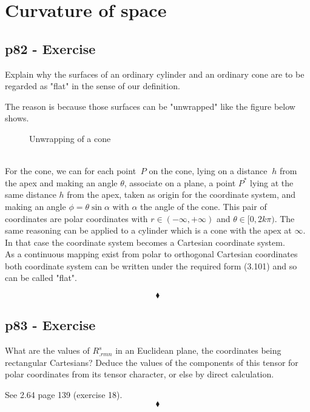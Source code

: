 \chapter{Curvature of space}
\pagebreak[4]

\section{p82 - Exercise}
\begin{tcolorbox}
Explain why the surfaces of an ordinary cylinder and an ordinary cone are to be regarded as "flat" in the sense of our definition.
\end{tcolorbox}
The reason is because those surfaces can be "unwrapped" like the figure below shows. 
\begin{figure}[h]


\caption{Unwrapping of a cone}
\end{figure}\\
For the cone, we can for each point $\ P $ on the cone, lying on a distance $\ h $ from the apex and making an angle $\theta $,  associate on a plane,  a  point $ P^* $ lying at the same  distance $ h $ from the apex, taken as origin for the coordinate system, and making an angle $\phi =  \theta \sin{\alpha} $ with $ \alpha $ the angle of the cone. This pair of coordinates are polar coordinates with $ r \in (-\infty, + \infty)$ and $\theta \in [0, 2k\pi)$. 
The same reasoning can be applied to a cylinder which is a cone with the apex at $\infty$. In that case the coordinate system becomes a Cartesian coordinate system. \\
As a continuous mapping exist from polar to orthogonal Cartesian coordinates both  coordinate system can be written under the required form (3.101) and so can be called "flat".

$$\blacklozenge$$
\newpage

\section{p83 - Exercise}
\begin{tcolorbox}
What are the values of $R^s_{.rmn}$ in an Euclidean plane, the coordinates being rectangular Cartesians? Deduce the values of the components of this tensor for polar coordinates from its tensor character, or else by direct calculation.
\end{tcolorbox}
See 2.64 page 139 (exercise 18).
$$\blacklozenge$$
\newpage

